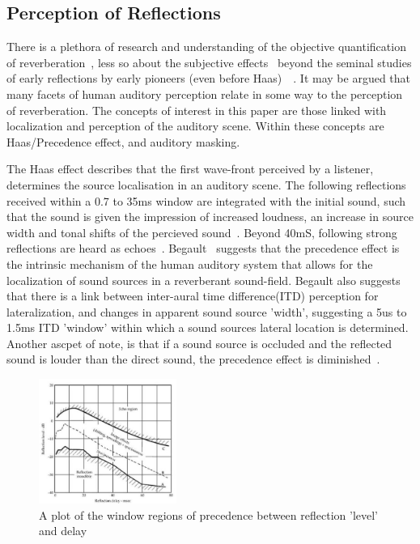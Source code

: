 \documentclass[paper=a4, fontsize=10pt, font=arial]{scrartcl} %
\numberwithin{equation}{section} %
\numberwithin{figure}{section} %
\numberwithin{table}{section} %
\begin{document}
\newpage

\subsection{Perception of Reflections}
There is a plethora of research and understanding of the objective quantification of reverberation~\cite{rossing2007springer}, less so about the subjective effects~\cite{Karjalainen2001} beyond the seminal studies of early reflections by early pioneers (even before Haas)~\cite{Haas1972}~\cite{Begault1995}. 
It may be argued that many facets of human auditory perception relate in some way to the perception of reverberation. The concepts of interest in this paper are those linked with localization and perception of the auditory scene. Within these concepts are Haas/Precedence effect, and auditory masking.

The Haas effect describes that the first wave-front perceived by a listener, determines the source localisation in an auditory scene. The following reflections received within a 0.7 to 35ms window are integrated with the initial sound, such that the sound is given the impression of increased loudness, an increase in source width and tonal shifts of the percieved sound~\cite{Everest2009}. Beyond 40mS, following strong reflections are heard as echoes~\cite{rossing2007springer}. 
Begault~\cite{Begault1995} suggests that the precedence effect is the intrinsic mechanism  of the human auditory system that allows for the localization of sound sources in a reverberant sound-field. 
Begault also suggests that there is a link between inter-aural time difference(ITD) perception for lateralization, and changes in apparent sound source 'width', suggesting a 5us to 1.5ms ITD 'window' within which a sound sources lateral location is determined. Another ascpet of note, is that if a sound source is occluded and the reflected sound is louder than the direct sound, the precedence effect is diminished~\cite{Wiggins2004}.

\begin{figure}[H]
\centering
\includegraphics[width=0.4\textwidth]{precedence.jpg}
\caption{A plot of the window regions of precedence between reflection 'level' and delay~\cite{Everest2009}}
\end{figure}
\end{document}
